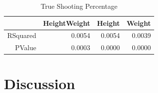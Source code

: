 \documentclass[12pt]{article}
\begin{document}
\begin{table}[ht]
\caption{True Shooting Percentage}
\label{tab:ts}
\centering
\begin{tabular}{rrrr}
  \hline
 & HeightWeight & Height & Weight \\ 
  \hline
RSquared & 0.0054 & 0.0054 & 0.0039 \\ 
  PValue & 0.0003 & 0.0000 & 0.0000 \\ 
   \hline
\end{tabular}
\end{table}



\section{Discussion}
\label{sec:disc}



\end{document}

